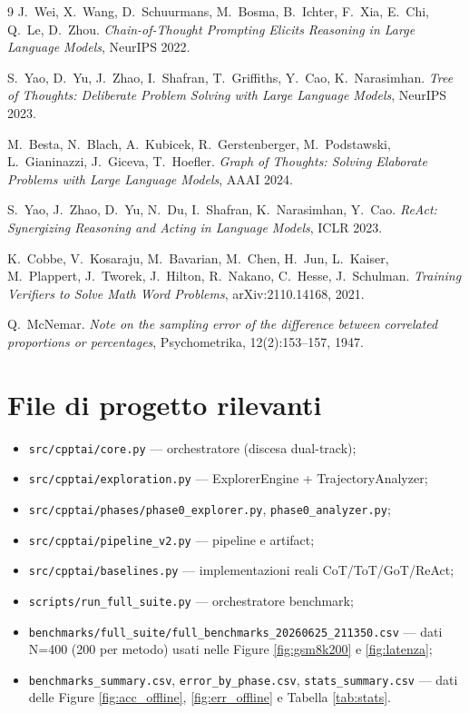 \documentclass[11pt,a4paper]{article}
\begin{document}
\begin{thebibliography}{9}
J.~Wei, X.~Wang, D.~Schuurmans, M.~Bosma, B.~Ichter, F.~Xia, E.~Chi,
Q.~Le, D.~Zhou.
\emph{Chain-of-Thought Prompting Elicits Reasoning in Large Language Models},
NeurIPS 2022.

S.~Yao, D.~Yu, J.~Zhao, I.~Shafran, T.~Griffiths, Y.~Cao, K.~Narasimhan.
\emph{Tree of Thoughts: Deliberate Problem Solving with Large Language Models},
NeurIPS 2023.

M.~Besta, N.~Blach, A.~Kubicek, R.~Gerstenberger, M.~Podstawski,
L.~Gianinazzi, J.~Giceva, T.~Hoefler.
\emph{Graph of Thoughts: Solving Elaborate Problems with Large Language Models},
AAAI 2024.

S.~Yao, J.~Zhao, D.~Yu, N.~Du, I.~Shafran, K.~Narasimhan, Y.~Cao.
\emph{ReAct: Synergizing Reasoning and Acting in Language Models},
ICLR 2023.

K.~Cobbe, V.~Kosaraju, M.~Bavarian, M.~Chen, H.~Jun, L.~Kaiser,
M.~Plappert, J.~Tworek, J.~Hilton, R.~Nakano, C.~Hesse, J.~Schulman.
\emph{Training Verifiers to Solve Math Word Problems}, arXiv:2110.14168, 2021.

Q.~McNemar.
\emph{Note on the sampling error of the difference between correlated proportions
or percentages}, Psychometrika, 12(2):153--157, 1947.
\end{thebibliography}

\appendix
\section{File di progetto rilevanti}
\label{sec:files}
\begin{itemize}[leftmargin=1.2em]
  \item \texttt{src/cpptai/core.py} --- orchestratore (discesa dual-track);
  \item \texttt{src/cpptai/exploration.py} --- ExplorerEngine + TrajectoryAnalyzer;
  \item \texttt{src/cpptai/phases/phase0\_explorer.py}, \texttt{phase0\_analyzer.py};
  \item \texttt{src/cpptai/pipeline\_v2.py} --- pipeline e artifact;
  \item \texttt{src/cpptai/baselines.py} --- implementazioni reali CoT/ToT/GoT/ReAct;
  \item \texttt{scripts/run\_full\_suite.py} --- orchestratore benchmark;
  \item \texttt{benchmarks/full\_suite/full\_benchmarks\_20260625\_211350.csv} ---
        dati N=400 (200 per metodo) usati nelle Figure \ref{fig:gsm8k200}
        e \ref{fig:latenza};
  \item \texttt{benchmarks\_summary.csv}, \texttt{error\_by\_phase.csv},
        \texttt{stats\_summary.csv} --- dati delle Figure \ref{fig:acc_offline},
        \ref{fig:err_offline} e Tabella \ref{tab:stats}.
\end{itemize}
\end{document}
